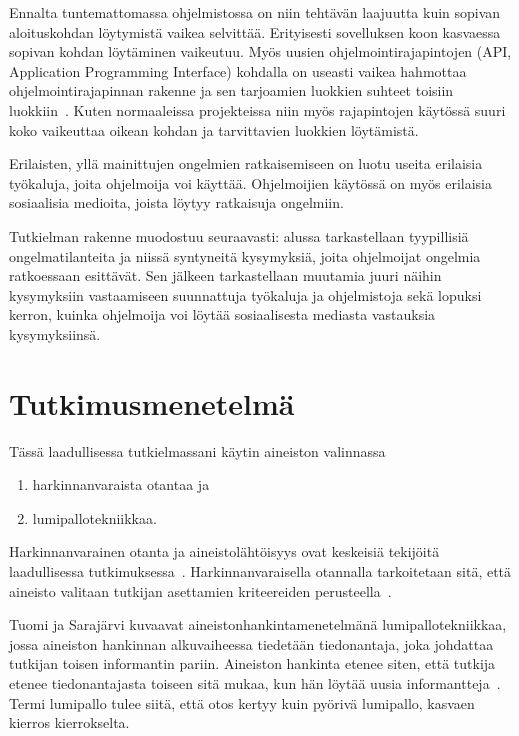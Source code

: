 \documentclass[finnish]{tktltiki2}
\theoremstyle{definition}
\theoremstyle{remark}
\begin{document}
Ennalta tuntemattomassa ohjelmistossa on niin tehtävän laajuutta kuin sopivan aloituskohdan löytymistä vaikea selvittää. Erityisesti sovelluksen koon kasvaessa sopivan kohdan löytäminen vaikeutuu.
Myös uusien ohjelmointirajapintojen (API, Application Programming Interface) kohdalla on useasti vaikea hahmottaa ohjelmointirajapinnan rakenne ja sen tarjoamien luokkien suhteet toisiin luokkiin~\cite{jungloid-mining}. Kuten normaaleissa projekteissa niin myös rajapintojen käytössä suuri koko vaikeuttaa oikean kohdan ja tarvittavien luokkien löytämistä.

Erilaisten, yllä mainittujen ongelmien ratkaisemiseen on luotu useita erilaisia työkaluja, joita ohjelmoija voi käyttää. Ohjelmoijien käytössä on myös erilaisia sosiaalisia medioita, joista löytyy ratkaisuja ongelmiin.

Tutkielman rakenne muodostuu seuraavasti: alussa tarkastellaan tyypillisiä ongelmatilanteita ja niissä syntyneitä kysymyksiä, joita ohjelmoijat ongelmia ratkoessaan esittävät. Sen jälkeen tarkastellaan muutamia juuri näihin kysymyksiin vastaamiseen suunnattuja työkaluja ja ohjelmistoja sekä lopuksi kerron, kuinka ohjelmoija voi löytää sosiaalisesta mediasta vastauksia kysymyksiinsä.

\section{Tutkimusmenetelmä}

Tässä laadullisessa tutkielmassani käytin aineiston valinnassa
\begin{enumerate}
  \item harkinnanvaraista otantaa ja
  \item lumipallotekniikkaa.
\end{enumerate}

Harkinnanvarainen otanta ja aineistolähtöisyys ovat keskeisiä tekijöitä laadullisessa tutkimuksessa~\cite[s. 16-20]{laadullinen-tutkimus-ja-sisallonanalyysi}.
Harkinnanvaraisella otannalla tarkoitetaan sitä, että aineisto valitaan tutkijan asettamien kriteereiden perusteella~\cite{aineiston-maara-ja-tutkittavat}.

Tuomi ja Sarajärvi kuvaavat aineistonhankintamenetelmänä lumipallotekniikkaa, jossa aineiston hankinnan alkuvaiheessa tiedetään tiedonantaja, joka johdattaa tutkijan toisen informantin pariin. Aineiston hankinta etenee siten, että tutkija etenee tiedonantajasta toiseen sitä mukaa, kun hän löytää uusia informantteja~\cite[s. 88]{johdatus-laadulliseen-tutkimukseen}. Termi lumipallo tulee siitä, että otos kertyy kuin pyörivä lumipallo, kasvaen kierros kierrokselta.
\end{document}
